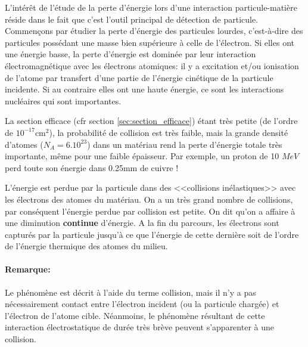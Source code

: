 L'intérêt de l'étude de la perte d'énergie lors d'une interaction particule-matière réside dans le fait que c'est l'outil principal de détection de particule. Commençons par étudier la perte d'énergie des particules lourdes, c'est-à-dire des particules possédant une masse bien supérieure à celle de l'électron. Si elles ont une énergie basse, la perte d'énergie est dominée par leur interaction électromagnétique avec les électrons atomiques: il y a excitation et/ou ionisation de l'atome par transfert d'une partie de l'énergie cinétique de la particule incidente. Si au contraire elles ont une haute énergie, ce sont les interactions nucléaires qui sont importantes. 

La section efficace (cfr section \ref{sec:section_efficace}) étant très petite (de l'ordre de $10^{-17}$cm$^2$), la probabilité de collision est très faible, mais la grande densité d'atomes ($N_A=6.10^{23}$) dans un matériau rend la perte d'énergie totale très importante, même pour une faible épaisseur. Par exemple, un proton de 10 $MeV$ perd toute son énergie dans 0.25mm de cuivre !

L'énergie est perdue par la particule dans des <<collisions inélastiques>> avec les électrons des atomes du matériau. On a un très grand nombre de collisions, par conséquent l'énergie perdue par collision est petite. On dit qu'on a affaire à une diminution \textbf{continue} d'énergie. A la fin du parcours, les électrons sont capturés par la particule jusqu'à ce que l'énergie de cette dernière soit de l'ordre de l'énergie thermique des atomes du milieu.

\paragraph{Remarque:} Le phénomène est décrit à l'aide du terme collision, mais il n'y a pas nécessairement contact entre l'électron incident (ou la particule chargée) et l'électron de l'atome cible. Néanmoins, le phénomène résultant de cette interaction électrostatique de durée très brève peuvent s'apparenter à une collision.  

